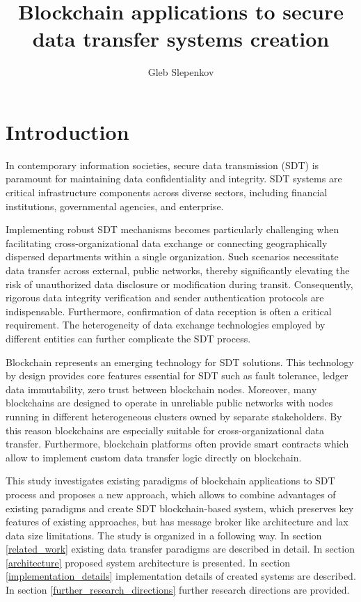 \documentclass[10pt]{llncs}
\begin{document}
\title{Blockchain applications to secure data transfer systems creation}
\author{Gleb Slepenkov}

\maketitle

\section{Introduction}

In contemporary information societies, secure data transmission (SDT) is paramount for maintaining data confidentiality and integrity. 
SDT systems are critical infrastructure components across diverse sectors, including financial institutions, governmental agencies, and enterprise.

Implementing robust SDT mechanisms becomes particularly challenging when facilitating cross-organizational data exchange or connecting geographically dispersed departments within a single organization. 
Such scenarios necessitate data transfer across external, public networks, thereby significantly elevating the risk of unauthorized data disclosure or modification during transit. 
Consequently, rigorous data integrity verification and sender authentication protocols are indispensable. 
Furthermore, confirmation of data reception is often a critical requirement. 
The heterogeneity of data exchange technologies employed by different entities can further complicate the SDT process.

Blockchain represents an emerging technology for SDT solutions. 
This technology by design provides core features essential for SDT such as fault tolerance, ledger data immutability, zero trust between blockchain nodes.
Moreover, many blockchains are designed to operate in unreliable public networks with nodes running in different heterogeneous clusters owned by separate stakeholders.
By this reason blockchains are especially suitable for cross-organizational data transfer.
Furthermore, blockchain platforms often provide smart contracts which allow to implement custom data transfer logic directly on blockchain.  

This study investigates existing paradigms of blockchain applications to SDT process and proposes a new approach, which allows to combine advantages of existing paradigms and create 
SDT blockchain-based system, which preserves key features of existing approaches, but has message broker like architecture and lax data size limitations.
The study is organized in a following way. 
In section \ref{related_work} existing data transfer paradigms are described in detail.
In section \ref{architecture} proposed system architecture is presented.
In section \ref{implementation_details} implementation details of created systems are described.
In section \ref{further_research_directions} further research directions are provided.
\end{document}

